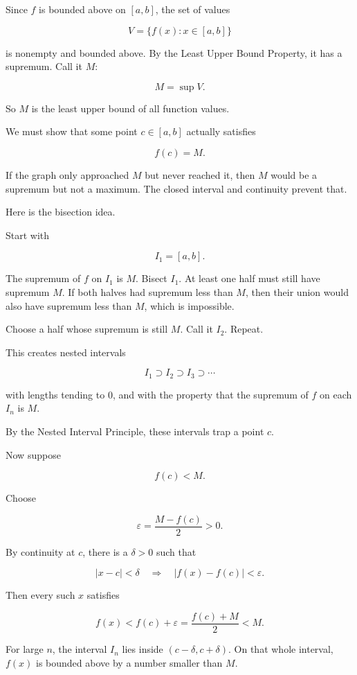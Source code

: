 Since \(f\) is bounded above on \([a,b]\), the set of values

\[
V=\{f(x):x\in[a,b]\}
\]

is nonempty and bounded above.  By the Least Upper Bound Property, it has a
supremum.  Call it \(M\):

\[
M=\sup V.
\]

So \(M\) is the least upper bound of all function values.

We must show that some point \(c\in[a,b]\) actually satisfies

\[
f(c)=M.
\]

If the graph only approached \(M\) but never reached it, then \(M\) would be a
supremum but not a maximum.  The closed interval and continuity prevent that.

Here is the bisection idea.

Start with

\[
I_1=[a,b].
\]

The supremum of \(f\) on \(I_1\) is \(M\).  Bisect \(I_1\).  At least one half must still
have supremum \(M\).  If both halves had supremum less than \(M\), then their union
would also have supremum less than \(M\), which is impossible.

Choose a half whose supremum is still \(M\).  Call it \(I_2\).  Repeat.

This creates nested intervals

\[
I_1\supset I_2\supset I_3\supset\cdots
\]

with lengths tending to \(0\), and with the property that the supremum of \(f\) on each
\(I_n\) is \(M\).

By the Nested Interval Principle, these intervals trap a point \(c\).

Now suppose

\[
f(c)<M.
\]

Choose

\[
\varepsilon=\frac{M-f(c)}{2}>0.
\]

By continuity at \(c\), there is a \(\delta>0\) such that

\[
|x-c|<\delta
\quad\Longrightarrow\quad
|f(x)-f(c)|<\varepsilon.
\]

Then every such \(x\) satisfies

\[
f(x)<f(c)+\varepsilon
=
\frac{f(c)+M}{2}
<
M.
\]

For large \(n\), the interval \(I_n\) lies inside \((c-\delta,c+\delta)\).  On that whole
interval, \(f(x)\) is bounded above by a number smaller than \(M\).

